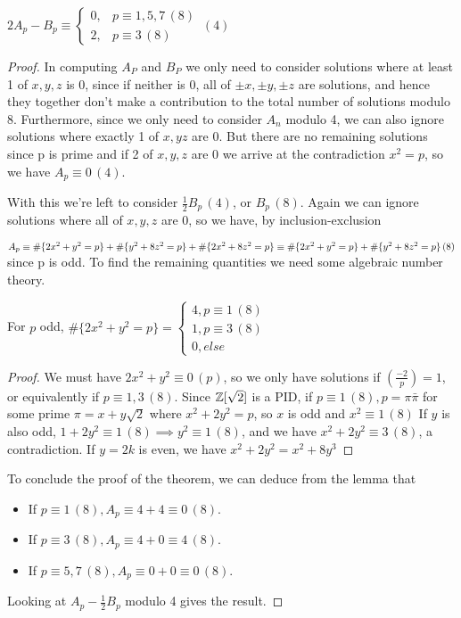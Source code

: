 \documentclass[12pt, a4paper]{amsart}
\begin{document}
\begin{thm}
  $2A_p - B_p \equiv \begin{cases} 0, & p \equiv 1, 5, 7 \, (8) \\
    2, & p \equiv 3 \, (8) \end{cases}
  \, (4)$
\end{thm}
\begin{proof}
  In computing $A_P$ and $B_P$ we only need to consider solutions
  where at least 1 of $x, y, z$ is 0, since if neither is 0, all of $\pm x, \pm y, \pm z$
  are solutions, and hence they together don't make a contribution to the total
  number of solutions modulo 8. Furthermore, since we only need to consider $A_n$
  modulo 4, we can also ignore solutions where exactly 1 of $x, y z$ are 0. But
  there are no remaining solutions since p is prime and if 2 of $x, y, z$ are 0 we
  arrive at the contradiction $x^2 = p$, so we have $A_p \equiv 0 \, (4)$.

  With this we're left to consider $\frac{1}{2}B_p \, (4)$, or $B_p \, (8)$. Again we can
  ignore solutions where all of $x, y, z$ are 0, so we have, by inclusion-exclusion

  \( A_p \equiv \#\{ 2x^2 + y^2 = p\} + \#\{y^2 + 8z^2 = p\} + \#\{2x^2 + 8z^2 = p\} \\
  \equiv \#\{ 2x^2 + y^2 = p\} + \#\{y^2 + 8z^2 = p\} \, (8)\)
  since p is odd. To find the remaining quantities we need some algebraic number
  theory.

\begin{lemma}
  For $p$ odd, $\#\{2x^2 + y^2 = p\} = \begin{cases} 4,
    p \equiv 1 \, (8) \\
    1, p \equiv 3 \, (8) \\
    0, else \end{cases}$
\end{lemma}
\begin{proof} We must have $2x^2 + y^2 \equiv 0 \, (p)$, so we only have solutions if
$(\frac{-2}{p}) = 1$, or equivalently if $p \equiv 1, 3 \, (8)$. Since
${\mathbb Z}[\sqrt{2}]$ is a PID, if $p \equiv 1 \, (8), p = \pi \bar{\pi}$ for some
prime $\pi = x + y \sqrt{2}$ where $x^2 + 2y^2 = p$, so $x$ is odd and $x^2
\equiv 1 \, (8)$
If $y$ is also odd, $1 + 2y^2 \equiv 1 \, (8) \implies y^2 \equiv 1 \, (8)$, and
we have $x^2 + 2y^2 \equiv 3 \, (8)$, a contradiction.
If $y = 2k$ is even, we have $x^2 + 2y^2 = x^2 + 8y^3$ 
\end{proof}

To conclude the proof of the theorem, we can deduce from the lemma that
\begin{itemize}
  \item If $p \equiv 1 \, (8), A_p \equiv 4+4 \equiv 0 \, (8)$.
  \item If $p \equiv 3 \, (8), A_p \equiv 4 + 0 \equiv 4 \, (8)$.
  \item If $p \equiv 5, 7 \, (8), A_p \equiv 0 + 0 \equiv 0 \, (8)$.
\end{itemize} 
Looking at $A_p - \frac{1}{2} B_p$ modulo 4 gives the result.
\end{proof}
\end{document}
